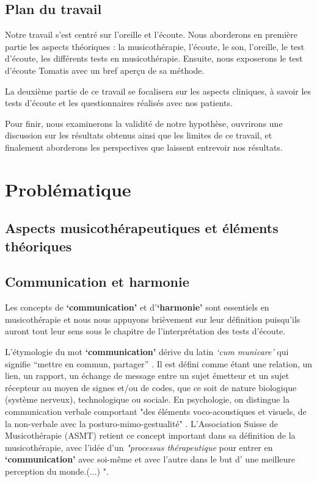 
\section*{Plan du travail}
Notre travail s'est centré sur l'oreille et l'écoute.
Nous aborderons en première partie les aspects théoriques : la musicothérapie, l'écoute, le son, l'oreille, 
le
test d'écoute, les différents tests en musicothérapie. Ensuite, nous
exposerons le test d'écoute Tomatis avec un bref aperçu de sa méthode.

La deuxième partie de ce travail se focalisera sur les aspects
cliniques, à savoir les tests d'écoute et les questionnaires  réalisés  avec  nos patients.

Pour finir, nous examinerons la validité de notre hypothèse, ouvrirons
une discussion sur les résultats obtenus ainsi que les limites de ce
travail, et finalement aborderons les perspectives que
laissent entrevoir nos résultats.


\chapter{Problématique}

\section{Aspects musicothérapeutiques et éléments théoriques}
\section*{Communication et harmonie}
Les concepts de \textbf{`communication'} et  d'\textbf{`harmonie'}
sont essentiels en
musicothérapie et nous nous appuyons brièvement
sur leur définition puisqu'ils auront tout  leur sens sous le chapitre de l'interprétation des tests
d'écoute.


L'étymologie du mot  \textbf{`communication'} dérive du latin  \textit{`cum
  municare'} qui signifie ``mettre en commun, partager'' \autocite{dicpetitrobert}.
Il est défini comme étant une
relation, un lien, un rapport, un échange de message entre un sujet émetteur et un
sujet récepteur au moyen de signes et/ou de codes, que ce soit de nature biologique (système nerveux), technologique ou sociale. En psychologie, on distingue la communication verbale comportant "des éléments voco-acoustiques et visuels, de la non-verbale avec la posturo-mimo-gestualité" \autocite{doronparot}.
L'Association Suisse
de Musicothérapie (ASMT) retient ce concept important dans sa définition de la musicothérapie, avec l'idée  d'un\textit{ "processus thérapeutique }pour entrer en \textbf{`communication'} avec soi-même et avec
l'autre dans le but d' une meilleure perception du
monde.(...) "\autocite{site_musitherapy}.


